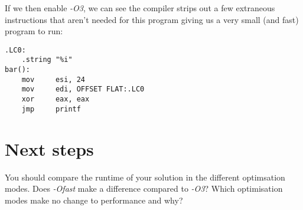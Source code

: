 \documentclass[a4paper,11pt]{article}
\begin{document}
If we then enable \emph{-O3}, we can see the compiler strips out a few
extraneous instructions that aren't needed for this program giving us a very
small (and fast) program to run:

\begin{verbatim}
.LC0:
    .string "%i"
bar():
    mov     esi, 24
    mov     edi, OFFSET FLAT:.LC0
    xor     eax, eax
    jmp     printf
\end{verbatim}

\section{Next steps}

You should compare the runtime of your solution in the different optimsation
modes. Does \emph{-Ofast} make a difference compared to \emph{-O3}? Which
optimisation modes make no change to performance and why?
\end{document}
